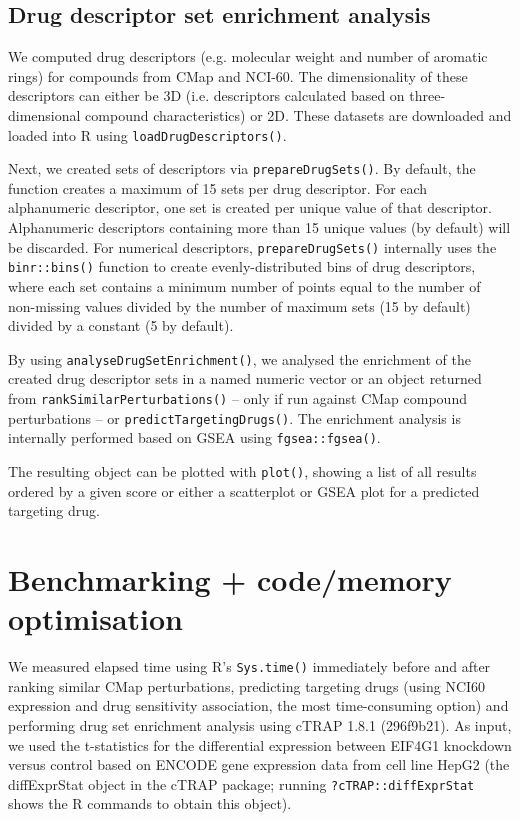 \subsection{Drug descriptor set enrichment analysis}

We computed drug descriptors (e.g. molecular weight and number of aromatic rings) for compounds from CMap and NCI-60. The dimensionality of these descriptors can either be 3D (i.e. descriptors calculated based on three-dimensional compound characteristics) or 2D. These datasets are downloaded and loaded into R using \texttt{loadDrugDescriptors()}.

Next, we created sets of descriptors via \texttt{prepareDrugSets()}. By default, the function creates a maximum of 15 sets per drug descriptor. For each alphanumeric descriptor, one set is created per unique value of that descriptor. Alphanumeric descriptors containing more than 15 unique values (by default) will be discarded. For numerical descriptors, \texttt{prepareDrugSets()} internally uses the \texttt{binr::bins()} function to create evenly-distributed bins of drug descriptors, where each set contains a minimum number of points equal to the number of non-missing values divided by the number of maximum sets (15 by default) divided by a constant (5 by default).

By using \texttt{analyseDrugSetEnrichment()}, we analysed the enrichment of the created drug descriptor sets in a named numeric vector or an object returned from \texttt{rankSimilarPerturbations()} – only if run against CMap compound perturbations – or \texttt{predictTargetingDrugs()}. The enrichment analysis is internally performed based on GSEA using \texttt{fgsea::fgsea()}.

The resulting object can be plotted with \texttt{plot()}, showing a list of all results ordered by a given score or either a scatterplot or GSEA plot for a predicted targeting drug.


\section{Benchmarking + code/memory optimisation}

We measured elapsed time using R’s \texttt{Sys.time()} immediately before and after ranking similar CMap perturbations, predicting targeting drugs (using NCI60 expression and drug sensitivity association, the most time-consuming option) and performing drug set enrichment analysis using cTRAP 1.8.1 (296f9b21). As input, we used the t-statistics for the differential expression between EIF4G1 knockdown versus control based on ENCODE gene expression data from cell line HepG2 (the diffExprStat object in the cTRAP package; running \verb|?cTRAP::diffExprStat| shows the R commands to obtain this object).

